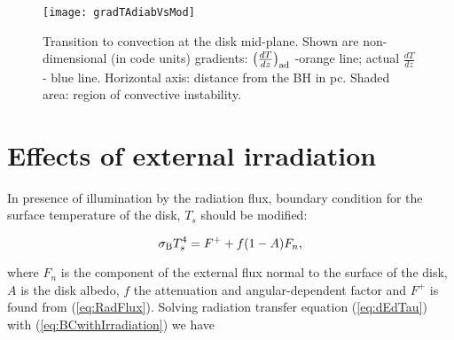 \documentclass[12pt,english,preprint]{aastex}
\begin{document}
\begin{figure}
\texttt{[image: gradTAdiabVsMod]} 
\caption{Transition to convection at the disk mid-plane. Shown are non-dimensional
(in code units) gradients: $\left(\frac{dT}{dz}\right)_{{\rm ad}}$
-orange line; actual $\frac{dT}{dz}$ - blue line. Horizontal axis:
distance from the BH in pc. Shaded area: region of convective instability.}
\label{fig:ConvRegion}
\end{figure}









\section{Effects of external irradiation}

In presence of illumination by the radiation flux, boundary condition
for the surface temperature of the disk, $T_{s}$ should be modified:

\begin{equation}
\sigma_{{\rm B}}T_{s}^{4}=F^{+}+f(1-A)F_{n}\mbox{,}\label{eq:BCwithIrradiation}
\end{equation}

\noindent where $F_{n}$ is the component of the external flux normal to the
surface of the disk, $A$ is the disk albedo, $f$ the attenuation and angular-dependent
factor and $F^{+}$ is found from (\ref{eq:RadFlux}). Solving radiation
transfer equation (\ref{eq:dEdTau}) with (\ref{eq:BCwithIrradiation})
we have
\end{document}
